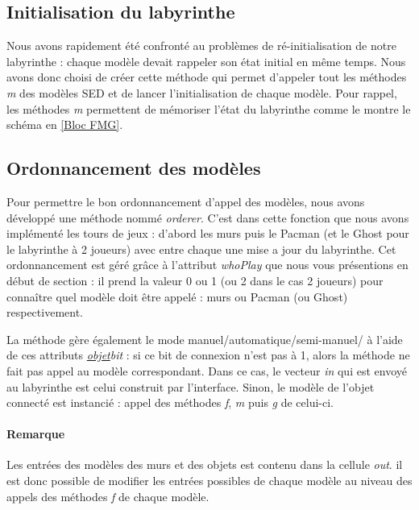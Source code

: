 \subsection{Initialisation du labyrinthe}\label{subsec:initLab}
Nous avons rapidement été confronté au problèmes de ré-initialisation de notre labyrinthe : chaque modèle devait rappeler son état initial en même temps. Nous avons donc choisi de créer cette méthode qui permet d'appeler tout les méthodes \emph{m} des modèles SED et de lancer l'initialisation de chaque modèle. Pour rappel, les méthodes \emph{m} permettent de mémoriser l'état du labyrinthe comme le montre le schéma en \ref{Bloc FMG}.

\subsection{Ordonnancement des modèles}\label{subsec:orderer}
Pour permettre le bon ordonnancement d'appel des modèles, nous avons développé une méthode nommé \emph{orderer}. C'est dans cette fonction que nous avons implémenté les tours de jeux : d'abord les murs puis le Pacman (et le Ghost pour le labyrinthe à 2 joueurs) avec entre chaque une mise a jour du labyrinthe. Cet ordonnancement est géré grâce à l'attribut \emph{whoPlay} que nous vous présentions en début de section : il prend la valeur 0 ou 1 (ou 2 dans le cas 2 joueurs) pour connaître quel modèle doit être appelé : murs ou Pacman (ou Ghost) respectivement.
 

La méthode gère également le mode manuel/automatique/semi-manuel/ à l'aide de ces attributs \emph{\underline{objet}bit} : si ce bit de connexion n'est pas à 1, alors la méthode ne fait pas appel au modèle correspondant. Dans ce cas, le vecteur \emph{in} qui est envoyé au labyrinthe est celui construit par l'interface. Sinon, le modèle de l'objet connecté est instancié : appel des méthodes \emph{f}, \emph{m} puis \emph{g} de celui-ci.

\paragraph*{Remarque} Les entrées des modèles des murs et des objets est contenu dans la cellule \emph{out}. il est donc possible de modifier les entrées possibles de chaque modèle au niveau des appels des méthodes \emph{f} de chaque modèle. 



 

